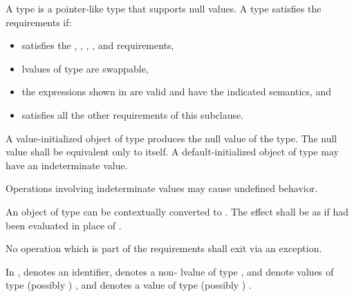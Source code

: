 \pnum
A  type is a pointer-like type that supports null values.
A type  satisfies the  requirements if:

\begin{itemize}
\item {} satisfies the ,
, , ,
and  requirements,

\item lvalues of type  are swappable,

\item the expressions shown in  are
valid and have the indicated semantics, and

\item {} satisfies all the other requirements of this subclause.
\end{itemize}

\pnum
A value-initialized object of type  produces the null value of the type.
The null value shall be equivalent only to itself. A default-initialized object
of type  may have an indeterminate value. \begin{note} Operations involving
indeterminate values may cause undefined behavior. \end{note}

\pnum
An object  of type  can be contextually converted to
. The effect shall be as if 
had been evaluated in place of .

\pnum
No operation which is part of the  requirements shall exit
via an exception.

\pnum
In ,  denotes an identifier, 
denotes a non- lvalue of type ,  and 
denote values of type (possibly ) , and  denotes
a value of type (possibly ) .

